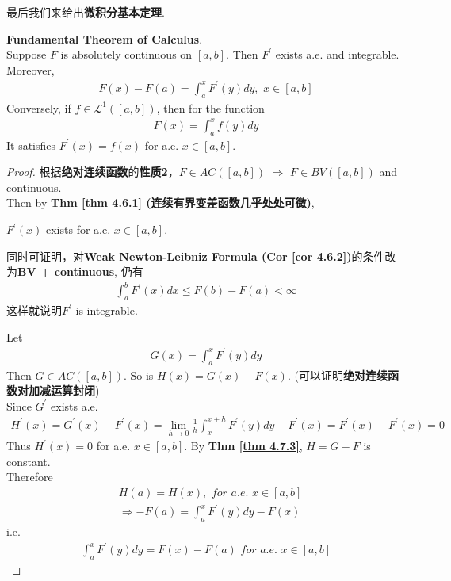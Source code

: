 	\newpage
	最后我们来给出\textbf{微积分基本定理}.
	\begin{thm}\label{thm 4.7.4}
		\textbf{Fundamental Theorem of Calculus}. \\
		Suppose $F$ is absolutely continuous on $[a , b]$. Then $F^{'}$ exists a.e. and integrable. Moreover, 
		\begin{align}
			F(x) - F(a) = \int_{a}^{x}{F^{'}(y) dy} , \,\, x \in [a , b]
		\end{align}
		Conversely, if $f \in \mathcal{L}^{1}([a , b])$, then for the function
		\begin{align}
			F(x) = \int_{a}^{x}{f(y) dy}
		\end{align}
		It satisfies $F^{'}(x) = f(x)$ for a.e. $x \in [a , b]$.
		
		\vspace{4em}
		\begin{proof}
			根据\textbf{绝对连续函数}的\textbf{性质2}，$F \in AC([a , b]) \,\, \Rightarrow \,\, F \in BV([a , b])$ and continuous. \\
			Then by \textbf{Thm \ref{thm 4.6.1} (连续有界变差函数几乎处处可微)},
			\begin{center}
				$F^{'}(x)$ exists for a.e. $x \in [a , b]$.
			\end{center}
			同时可证明，对\textbf{Weak Newton-Leibniz Formula (Cor \ref{cor 4.6.2})}的条件改为\textbf{BV + continuous}, 仍有
			\begin{align}
				\int_{a}^{b}{F^{'}(x) dx} \leq F(b) - F(a) < \infty
			\end{align}
			这样就说明$F^{'}$ is integrable. 
			
			\vspace{1em}
			
			Let
			\begin{align}
				G(x) = \int_{a}^{x}{F^{'}(y) dy}
			\end{align}
			Then $G \in AC([a , b])$. So is $H(x) = G(x) - F(x)$. (可以证明\textbf{绝对连续函数对加减运算封闭}) \\
			Since $G^{'}$ exists a.e. 
			\begin{align}
				H^{'}(x)
				=G^{'}(x) - F^{'}(x) 
				= \lim_{h \to 0}{\frac{1}{h} \int_{x}^{x + h}{F^{'}(y) dy}} - F^{'}(x)
				= F^{'}(x) - F^{'}(x)
				= 0
			\end{align}
			Thus $H^{'}(x) = 0$ for a.e. $x \in [a , b]$. By \textbf{Thm \ref{thm 4.7.3}}, $H = G - F$ is constant. \\
			Therefore
			\begin{align}
				&H(a) = H(x) , \,\, for \,\, a.e. \,\, x \in [a , b] \\
				&\Rightarrow -F(a) = \int_{a}^{x}{F^{'}(y) dy} - F(x)
			\end{align}
			i.e.
			\begin{align}
				\int_{a}^{x}{F^{'}(y) dy} = F(x) - F(a) \,\, for \,\, a.e. \,\, x \in [a , b]
			\end{align}
		\end{proof}
	\end{thm}
	


	\ifx\allfiles\undefined

\fi